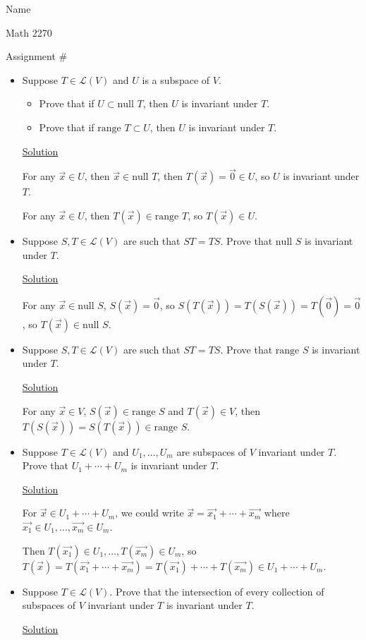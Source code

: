 \documentclass[12pt]{article}
\begin{document}
\hfill Name 

\hfill Math 2270

\hfill Assignment \#


\begin{itemize}
\item[1)] Suppose $T \in \mathcal{L}(V)$ and $U$ is a subspace of $V$.
\begin{itemize}
    \item Prove that if $U \subset \text{null } T$, then $U$ is invariant under $T$.
    \item Prove that if $\text{range } T \subset U$, then $U$ is invariant under $T$.
\end{itemize}

\underline{Solution}

For any $\vec{x}\in U$, then $\vec{x}\in\text{null } T$, then $T(\vec{x})=\vec{0}\in U$, so $U$ is invariant under $T$.

For any $\vec{x}\in U$, then $T(\vec{x})\in\text{range } T$, so $T(\vec{x})\in U$.

\item[2)] Suppose $S,T \in \mathcal{L}(V)$ are such that $ST = TS$. Prove that $\text{null } S$ is invariant under $T$.

\underline{Solution}

For any $\vec{x}\in \text{null } S$, $S(\vec{x})=\vec{0}$, so $S(T(\vec{x}))=T(S(\vec{x}))=T(\vec{0})=\vec{0}$, so $T(\vec{x})\in \text{null } S$.

\item[3)] Suppose $S,T \in \mathcal{L}(V)$ are such that $ST = TS$. Prove that $\text{range } S$ is invariant under $T$.

\underline{Solution}

For any $\vec{x}\in V$, $S(\vec{x})\in\text{range } S$ and $T(\vec{x})\in V$, then $T(S(\vec{x}))=S(T(\vec{x}))\in\text{range } S$.

\item[4)] Suppose $T \in \mathcal{L}(V)$ and $U_1,\dots,U_m$ are subspaces of $V$ invariant under $T$. Prove that $U_1+\cdots+U_m$ is invariant under $T$.

\underline{Solution}

For $\vec{x}\in U_1+\cdots+U_m$, we could write $\vec{x}=\vec{x_1}+\cdots +\vec{x_m}$ where $\vec{x_1}\in U_1,\dots,\vec{x_m}\in U_m$.

Then $T(\vec{x_1})\in U_1,\dots,T(\vec{x_m})\in U_m$, so $T(\vec{x})=T(\vec{x_1}+\cdots +\vec{x_m})=T(\vec{x_1})+\cdots +T(\vec{x_m})\in U_1+\cdots+U_m$.

\item[5)] Suppose $T \in \mathcal{L}(V)$. Prove that the intersection of every collection of subspaces of $V$ invariant under $T$ is invariant under $T$.

\underline{Solution}

\end{itemize}
\end{document}

